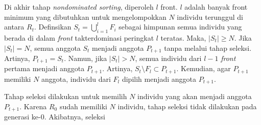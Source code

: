 Di akhir tahap \textit{nondominated sorting}, diperoleh $l$ front. $l$ adalah banyak front minimum yang dibutuhkan untuk mengelompokkan $N$ individu terunggul di antara $R_t$. Definsikan $S_t = \bigcup_{i=1}^l F_i$ sebagai himpunan semua individu yang berada di dalam \textit{front} takterdominasi peringkat $l$ teratas. Maka, $|S_t| \geq N$. Jika $|S_t| = N$, semua anggota $S_t$ menjadi anggota $P_{t+1}$ tanpa melalui tahap seleksi. Artinya, $P_{t+1}=S_t$. Namun, jika $|S_t|>N$, semua individu dari $l-1$ \textit{front} pertama menjadi anggota $P_{t+1}$. Artinya, $S_t \setminus F_l \subset P_{t+1}$. Kemudian, agar $P_{t+1}$ memiliki $N$ anggota, individu dari $F_l$ dipilih menjadi anggota $P_{t+1}$. 

Tahap seleksi dilakukan untuk memilih $N$ individu yang akan menjadi anggota $P_{t+1}$. Karena $R_0$ sudah memiliki $N$ individu, tahap seleksi tidak dilakukan pada generasi ke-0. Akibatnya, seleksi
